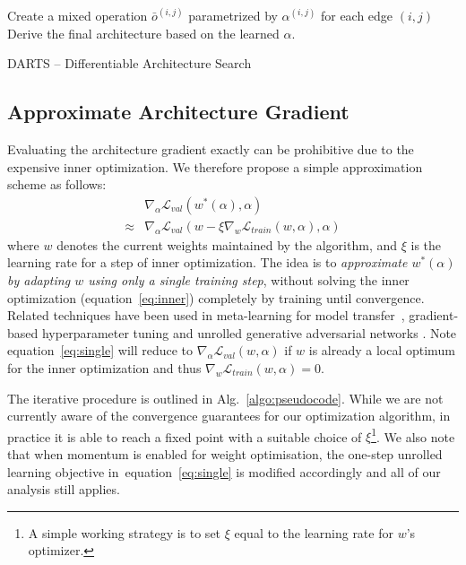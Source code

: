 \documentclass{article}
\def\eqref#1{equation~\ref{#1}}
\begin{document}
\begin{algorithm}[t]
\DontPrintSemicolon
Create a mixed operation $\bar{o}^{(i,j)}$ parametrized by $\alpha^{(i,j)}$ for each edge $(i,j)$\;
Derive the final architecture based on the learned $\alpha$.
\caption{{\sc DARTS} -- Differentiable Architecture Search}
\label{algo:pseudocode}
\end{algorithm}

\subsection{Approximate Architecture Gradient}
\label{sec:sec:approximation}
Evaluating the architecture gradient exactly can be prohibitive due to the expensive inner optimization.
We therefore propose a simple approximation scheme as follows:
\begin{align}
&\nabla_\alpha \mathcal{L}_{val}(w^*(\alpha), \alpha) \\
\approx &\nabla_\alpha \mathcal{L}_{val}(w - \xi \nabla_{w} \mathcal{L}_{train}(w, \alpha), \alpha) \label{eq:single}
\end{align}
where $w$ denotes the current weights maintained by the algorithm,
and $\xi$ is the learning rate for a step of inner optimization.
The idea is to \emph{approximate $w^*(\alpha)$
by adapting $w$ using only a single training step}, without solving the inner optimization (\eqref{eq:inner}) completely by training until convergence.
Related techniques have been used in meta-learning for model transfer~\citep{finn2017model}, gradient-based hyperparameter tuning \citep{luketina2016scalable} and unrolled generative adversarial networks \citep{metz2016unrolled}.
Note \eqref{eq:single} will reduce to $\nabla_\alpha \mathcal{L}_{val}(w, \alpha)$ if $w$ is already a local optimum for the inner optimization and thus $\nabla_w \mathcal{L}_{train}(w, \alpha) = 0$.

The iterative procedure is outlined in Alg.~\ref{algo:pseudocode}.
While we are not currently aware of the convergence guarantees for our optimization algorithm, in practice it is able to reach a fixed point with a suitable choice of $\xi$\footnote{A simple working strategy is to set $\xi$ equal to the learning rate for $w$'s optimizer.}.
We also note that
when momentum is enabled for weight optimisation,
the one-step unrolled learning objective in~\eqref{eq:single} is modified accordingly and all of our analysis still applies.
\end{document}
